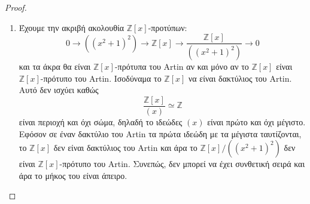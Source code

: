 \documentclass[oneside,a4paper]{article}
\newcommand {\tl}{\textlatin}
\newcommand{\Z}{\mathbb{Z}}
\begin{document}
\begin{proof}
\begin{enumerate}
		\item Έχουμε την ακριβή ακολουθία $\Z [x]$-προτύπων:
		$$0\rightarrow ((x^2+1)^2) \rightarrow \Z [x] \rightarrow \frac{\Z [x]}{((x^2+1)^2)} \rightarrow 0$$
		και τα άκρα θα είναι $\Z [x]$-πρότυπα του \tl{Artin} αν και μόνο αν το $\Z [x]$ είναι $\Z[x]$-πρότυπο του \tl{Artin}. Ισοδύναμα το $\Z[x]$ να είναι δακτύλιος του \tl{Artin}. Αυτό δεν ισχύει καθώς $$\frac{\Z [x]}{(x)} \simeq \Z$$ είναι περιοχή και όχι σώμα, δηλαδή το ιδεώδες $(x)$ είναι πρώτο και όχι μέγιστο. Εφόσον σε έναν δακτύλιο του \tl{Artin} τα πρώτα ιδεώδη με τα μέγιστα ταυτίζονται, το $\Z [x]$ δεν είναι δακτύλιος του \tl{Artin} και άρα το $\Z[x]/((x^2+1)^2)$ δεν είναι $\Z [x]$-πρότυπο του \tl{Artin}. Συνεπώς, δεν μπορεί να έχει συνθετική σειρά και άρα το μήκος του είναι άπειρο.
	\end{enumerate}
\end{proof}
\pagebreak
\end{document}
